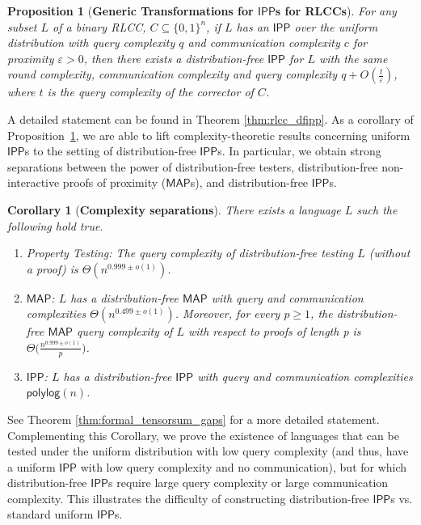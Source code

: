 \documentclass[10pt,a4paper]{article}
\newtheorem{proposition}[theorem]{Proposition}
\newtheorem{corollary}[theorem]{Corollary}
\newcommand{\polylog}{\mathsf{polylog}}
\newcommand{\IPP}{\mathsf{IPP}}
\newcommand{\MAP}{\mathsf{MAP}}
\begin{document}
\begin{proposition}[\textbf{Generic Transformations for $\IPP$s for RLCCs}]
\label{thm:informal_locCorr}
For any subset $L$ of a binary RLCC, $C \subseteq \{0,1\}^n$, if $L$ has an $\IPP$ over the uniform distribution with query complexity $q$ and communication complexity $c$ for proximity $\varepsilon > 0$, then there exists a distribution-free $\IPP$ for $L$ with the same round complexity, communication complexity and query complexity $q+O(\frac{t}{\varepsilon})$, where $t$ is the query complexity of the corrector of $C$.
\end{proposition}


A detailed statement can be found in Theorem \ref{thm:rlcc_dfipp}. As a corollary of Proposition~\ref{thm:informal_locCorr}, we are able to lift complexity-theoretic results concerning uniform $\IPP$s to the setting of distribution-free $\IPP$s. In particular, we obtain strong separations between the power of distribution-free testers, distribution-free non-interactive proofs of proximity ($\MAP$s), and distribution-free $\IPP$s.


\begin{corollary}[\textbf{Complexity separations}]
\label{thm:informal_tensorsum_gaps}
    There exists a language $L$ such the following hold true.
    \begin{enumerate}
        \item \textsf{Property Testing}: The query complexity of distribution-free testing $L$ (without a proof) is $\Theta(n^{0.999\pm o(1)})$.
        \item $\MAP$: $L$ has a distribution-free $\MAP$ with query and communication complexities $\Theta(n^{0.499\pm o(1)})$. Moreover, for every $p \geq 1$, the distribution-free $\MAP$ query complexity of $L$ with respect to proofs of length p is $\Theta\big(\frac{n^{0.999\pm o(1)}}{p}\big)$.
        \item $\IPP$: $L$ has a distribution-free $\IPP$ with query and communication complexities $\polylog(n)$.
    \end{enumerate}
\end{corollary}
See Theorem \ref{thm:formal_tensorsum_gaps} for a more detailed statement. Complementing this Corollary, we prove the existence of languages that can be tested under the uniform distribution with low query complexity (and thus, have a uniform $\IPP$ with low query complexity and no communication), but for which distribution-free $\IPP$s require large query complexity or large communication complexity. This illustrates the difficulty of constructing distribution-free $\IPP$s vs. standard uniform $\IPP$s.
\end{document}
